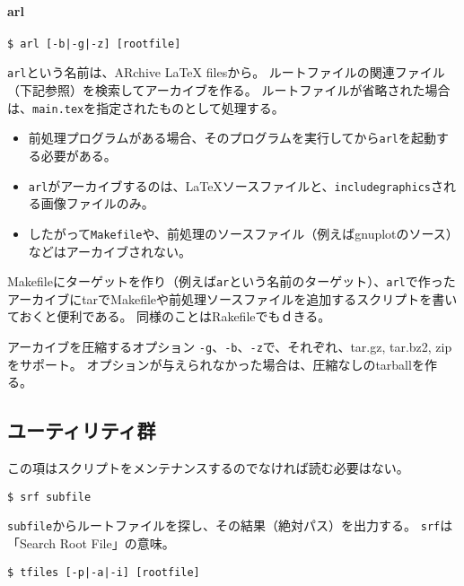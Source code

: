 \hypertarget{arl}{%
\paragraph{arl}\label{arl}}

\begin{verbatim}
$ arl [-b|-g|-z] [rootfile]
\end{verbatim}

\texttt{arl}という名前は、ARchive LaTeX filesから。
ルートファイルの関連ファイル（下記参照）を検索してアーカイブを作る。
ルートファイルが省略された場合は、\texttt{main.tex}を指定されたものとして処理する。

\begin{itemize}
\tightlist
\item
  前処理プログラムがある場合、そのプログラムを実行してから\texttt{arl}を起動する必要がある。
\item
  \texttt{arl}がアーカイブするのは、LaTeXソースファイルと、\texttt{includegraphics}される画像ファイルのみ。
\item
  したがって\texttt{Makefile}や、前処理のソースファイル（例えばgnuplotのソース）などはアーカイブされない。
\end{itemize}

Makefileにターゲットを作り（例えば\texttt{ar}という名前のターゲット）、\texttt{arl}で作ったアーカイブにtarでMakefileや前処理ソースファイルを追加するスクリプトを書いておくと便利である。
同様のことはRakefileでもｄきる。

アーカイブを圧縮するオプション
\texttt{-g}、\texttt{-b}、\texttt{-z}で、それぞれ、tar.gz, tar.bz2,
zipをサポート。
オプションが与えられなかった場合は、圧縮なしのtarballを作る。

\hypertarget{ux30e6ux30fcux30c6ux30a3ux30eaux30c6ux30a3ux7fa4}{%
\subsection{ユーティリティ群}\label{ux30e6ux30fcux30c6ux30a3ux30eaux30c6ux30a3ux7fa4}}

この項はスクリプトをメンテナンスするのでなければ読む必要はない。

\begin{verbatim}
$ srf subfile
\end{verbatim}

\texttt{subfile}からルートファイルを探し、その結果（絶対パス）を出力する。
\texttt{srf}は「Search Root File」の意味。

\begin{verbatim}
$ tfiles [-p|-a|-i] [rootfile]
\end{verbatim}


